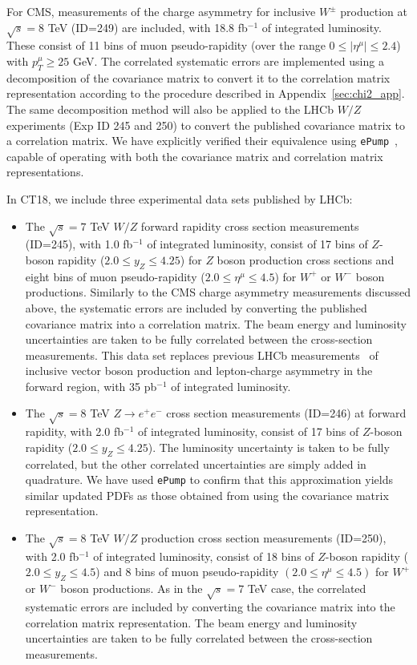 For CMS, measurements of the charge asymmetry for inclusive ${W}^{\pm}$ production at ${\sqrt{s}} = 8$ TeV \cite{Khachatryan:2016pev} (ID=249) are included, with 18.8 fb$^{-1}$ of integrated luminosity.
These consist of 11 bins of muon pseudo-rapidity (over the range $0\leq |\eta^\mu|\leq 2.4$) with $p^\mu_T \geq 25$ GeV. The correlated systematic errors are implemented using a decomposition
of the covariance matrix to convert it to the
correlation matrix representation according to the procedure described in Appendix~\ref{sec:chi2_app}.
The same decomposition method will also be applied to the LHCb $W/Z$ experiments (Exp ID 245 and 250) to convert the published covariance matrix to a correlation matrix.
We have explicitly verified their equivalence using \texttt{ePump}~\cite{Hou:2019gfw}, capable of operating with both the covariance matrix and correlation matrix representations. 

In CT18, we include three experimental data sets published by LHCb: 
%
\begin{itemize}
%
\item The $\sqrt{s}=7$ TeV $W/Z$ forward rapidity cross section measurements \cite{Aaij:2015gna} (ID=245), with 1.0 fb$^{-1}$ of integrated luminosity, consist of 17 bins of $Z$-boson
rapidity ($2.0 \leq y_Z \leq 4.25$) for $Z$ boson production cross sections and eight bins of muon pseudo-rapidity ($2.0 \leq \eta^\mu \leq 4.5$) for $W^+$ or $W^-$ boson productions.
Similarly to the CMS charge asymmetry measurements discussed above, the systematic errors
are included by converting the published covariance matrix into
a correlation matrix.
The beam energy and luminosity
uncertainties are taken to be fully correlated between the cross-section measurements. This data set replaces previous LHCb measurements~\cite{Aaij:2012vn} of
inclusive vector boson production and lepton-charge asymmetry in the forward region, with 35 pb$^{-1}$ of integrated luminosity.

\item The $\sqrt{s}=8$ TeV $Z\rightarrow e^+e^-$ cross section measurements \cite{Aaij:2015vua} (ID=246) at forward rapidity, with 2.0 fb$^{-1}$ of integrated luminosity, consist of 17
bins of $Z$-boson rapidity ($2.0 \leq y_Z \leq 4.25$). 
The luminosity uncertainty is taken to be fully correlated, but the other correlated uncertainties are simply added in quadrature. We have used \texttt{ePump} to confirm that this approximation yields similar updated PDFs as those obtained from using the covariance matrix representation.  


\item The $\sqrt{s}=8$ TeV $W/Z$ production cross section measurements \cite{Aaij:2015zlq} (ID=250), with 2.0 fb$^{-1}$ of integrated luminosity, consist of 18 bins of $Z$-boson rapidity
($2.0 \leq y_Z \leq 4.5$) and 8 bins of muon pseudo-rapidity $(2.0 \leq \eta^\mu \leq 4.5)$  for $W^+$ or $W^-$ boson productions. As in the $\sqrt{s}=7$ TeV case, the correlated systematic errors are included by converting the covariance matrix into the correlation matrix representation.
 The beam energy and luminosity uncertainties are taken to be fully correlated between the cross-section measurements.

\end{itemize}


